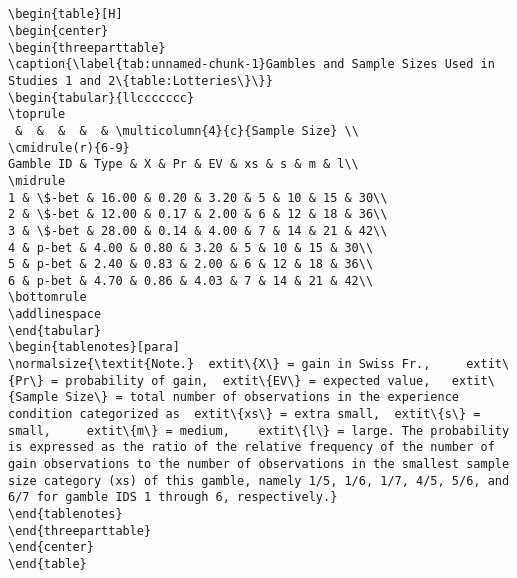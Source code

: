 \documentclass[]{standalone}
\begin{document}
\begin{verbatim}


\begin{table}[H]
\begin{center}
\begin{threeparttable}
\caption{\label{tab:unnamed-chunk-1}Gambles and Sample Sizes Used in Studies 1 and 2\{table:Lotteries\}\}}
\begin{tabular}{llccccccc}
\toprule
 &  &  &  &  & \multicolumn{4}{c}{Sample Size} \\
\cmidrule(r){6-9}
Gamble ID & Type & X & Pr & EV & xs & s & m & l\\
\midrule
1 & \$-bet & 16.00 & 0.20 & 3.20 & 5 & 10 & 15 & 30\\
2 & \$-bet & 12.00 & 0.17 & 2.00 & 6 & 12 & 18 & 36\\
3 & \$-bet & 28.00 & 0.14 & 4.00 & 7 & 14 & 21 & 42\\
4 & p-bet & 4.00 & 0.80 & 3.20 & 5 & 10 & 15 & 30\\
5 & p-bet & 2.40 & 0.83 & 2.00 & 6 & 12 & 18 & 36\\
6 & p-bet & 4.70 & 0.86 & 4.03 & 7 & 14 & 21 & 42\\
\bottomrule
\addlinespace
\end{tabular}
\begin{tablenotes}[para]
\normalsize{\textit{Note.}  extit\{X\} = gain in Swiss Fr.,     extit\{Pr\} = probability of gain,  extit\{EV\} = expected value,   extit\{Sample Size\} = total number of observations in the experience condition categorized as  extit\{xs\} = extra small,  extit\{s\} = small,     extit\{m\} = medium,    extit\{l\} = large. The probability is expressed as the ratio of the relative frequency of the number of gain observations to the number of observations in the smallest sample size category (xs) of this gamble, namely 1/5, 1/6, 1/7, 4/5, 5/6, and 6/7 for gamble IDS 1 through 6, respectively.}
\end{tablenotes}
\end{threeparttable}
\end{center}
\end{table}
\end{verbatim}
\end{document}
